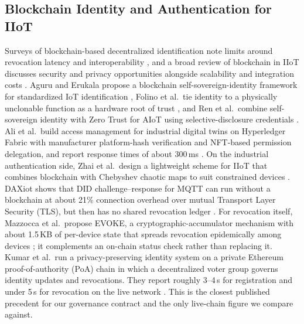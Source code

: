 \subsection{Blockchain Identity and Authentication for IIoT}
Surveys of blockchain-based decentralized identification note limits around revocation latency and interoperability \cite{hosseini2023blockchain}, and a broad review of blockchain in IIoT discusses security and privacy opportunities alongside scalability and integration costs \cite{essaid2025iiotbc}. Aguru and Erukala propose a blockchain self-sovereign-identity framework for standardized IoT identification \cite{aguru2025ssi}, Folino et al.\ tie identity to a physically unclonable function as a hardware root of trust \cite{folino2025puf}, and Ren et al.\ combine self-sovereign identity with Zero Trust for AIoT using selective-disclosure credentials \cite{ren2025aiot}. Ali et al.\ build access management for industrial digital twins on Hyperledger Fabric with manufacturer platform-hash verification and NFT-based permission delegation, and report response times of about 300\,ms \cite{ali2025dtaccess}. On the industrial authentication side, Zhai et al.\ design a lightweight scheme for IIoT that combines blockchain with Chebyshev chaotic maps to suit constrained devices \cite{zhai2025chebyshev}. DAXiot shows that DID challenge--response for MQTT can run without a blockchain at about 21\% connection overhead over mutual Transport Layer Security (TLS), but then has no shared revocation ledger \cite{philipp2023daxiot}. For revocation itself, Mazzocca et al.\ propose EVOKE, a cryptographic-accumulator mechanism with about 1.5\,KB of per-device state that spreads revocation epidemically among devices \cite{mazzocca2024evoke}; it complements an on-chain status check rather than replacing it. Kumar et al.\ run a privacy-preserving identity system on a private Ethereum proof-of-authority (PoA) chain in which a decentralized voter group governs identity updates and revocations. They report roughly 3--4\,s for registration and under 5\,s for revocation on the live network \cite{kumar2026privacy}. This is the closest published precedent for our governance contract and the only live-chain figure we compare against.

